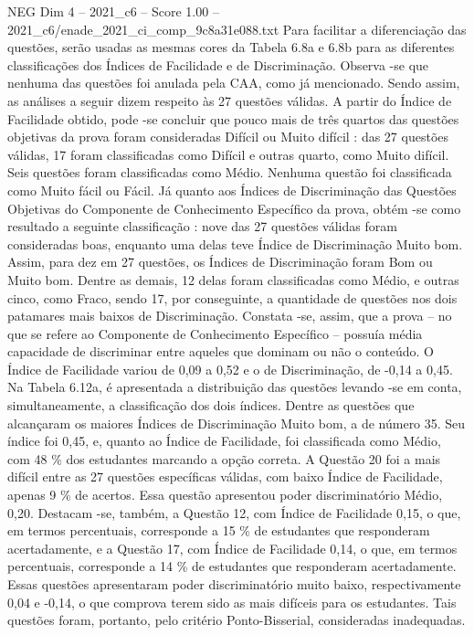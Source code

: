 \begin{textsample}{NEG Dim 4 – 2021\_c6 – Score 1.00 – 2021\_c6/enade\_2021\_ci\_comp\_9c8a31e088.txt}
Para facilitar a diferenciação das questões, serão usadas as mesmas cores da Tabela 6.8a e 6.8b para as diferentes classificações dos Índices de Facilidade e de Discriminação.
Observa -se que nenhuma das questões foi anulada pela CAA, como já mencionado.
Sendo assim, as análises a seguir dizem respeito às 27 questões válidas.
A partir do Índice de Facilidade obtido, pode -se concluir que pouco mais de três quartos das questões objetivas da prova foram consideradas Difícil ou Muito difícil : das 27 questões válidas, 17 foram classificadas como Difícil e outras quarto, como Muito difícil.
Seis questões foram classificadas como Médio.
Nenhuma questão foi classificada como Muito fácil ou Fácil.
Já quanto aos Índices de Discriminação das Questões Objetivas do Componente de Conhecimento Específico da prova, obtém -se como resultado a seguinte classificação : nove das 27 questões válidas foram consideradas boas, enquanto uma delas teve Índice de Discriminação Muito bom.
Assim, para dez em 27 questões, os Índices de Discriminação foram Bom ou Muito bom.
Dentre as demais, 12 delas foram classificadas como Médio, e outras cinco, como Fraco, sendo 17, por conseguinte, a quantidade de questões nos dois patamares mais baixos de Discriminação.
Constata -se, assim, que a prova – no que se refere ao Componente de Conhecimento Específico – possuía média capacidade de discriminar entre aqueles que dominam ou não o conteúdo.
O Índice de Facilidade variou de 0,09 a 0,52 e o de Discriminação, de -0,14 a 0,45.
Na Tabela 6.12a, é apresentada a distribuição das questões levando -se em conta, simultaneamente, a classificação dos dois índices.
Dentre as questões que alcançaram os maiores Índices de Discriminação Muito bom, a de número 35.
Seu índice foi 0,45, e, quanto ao Índice de Facilidade, foi classificada como Médio, com 48 \% dos estudantes marcando a opção correta.
A Questão 20 foi a mais difícil entre as 27 questões específicas válidas, com baixo Índice de Facilidade, apenas 9 \% de acertos.
Essa questão apresentou poder discriminatório Médio, 0,20.
Destacam -se, também, a Questão 12, com Índice de Facilidade 0,15, o que, em termos percentuais, corresponde a 15 \% de estudantes que responderam acertadamente, e a Questão 17, com Índice de Facilidade 0,14, o que, em termos percentuais, corresponde a 14 \% de estudantes que responderam acertadamente.
Essas questões apresentaram poder discriminatório muito baixo, respectivamente 0,04 e -0,14, o que comprova terem sido as mais difíceis para os estudantes.
Tais questões foram, portanto, pelo critério Ponto-Bisserial, consideradas inadequadas.

\end{textsample}

